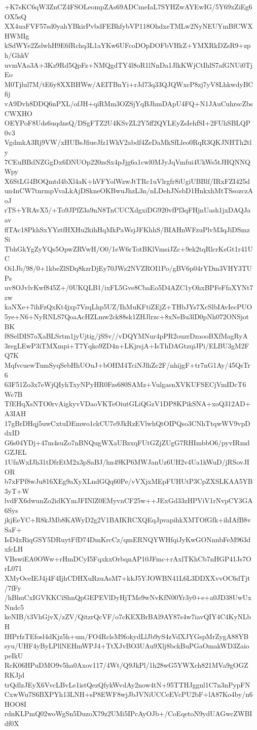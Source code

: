 +K7sKC6qW3ZnCZ4FSOLeompZAs69ADCmeIaL7SYHZwAYEwIG/5Y69xZiEg6OX5sQ
XX4uaFVF57sd0yahYBkirPvbdFEBhfybVP118OhdxeTMLw2NyNEUYmBfCWXHWMIg
kSdWYe2ZslwhH9E6fRchq3L1aYKw6UFcoDOpDOFbVHkZ+YMXRkDZsR9+zph/GhkV
uvmVAa3A+3Kz9Rd5QpFz+NMQgdTY4l8oR1lNnDa1JlkKWjCtIhlS7afGNUi0TjEo
M0Tjlul7M/tE6y8XXBHWw/AEITBnYi+rJd73q33QJQWxcP8zj7yV8LhkwdyBCfij
vA9Dvh8DDQ6nPXL/ofJH+qiRMm3OZSjYqBJhmDApU4FQ+N1JAuCuhrscZbsCWXHO
OEYPoF8Uds6uqdnsQ/DSgFTZ2U4KSvZL2Y5ff2QYLEyZsIehfSI+2FUhSBLQP0v3
VgdmkA3Rj9VW/xHUBsJfiueJfz1WkV2abdf4ZeDaMkSfLleo0RqR3QKJNHTh2tly
7CEuBBdNZGgDx6DNUOp220zsSx4pJjg6a1cwl0MJyJqVmfui4UkWs5tJHQNNQWpy
X6StLG4BOQmtd4bXl4aK+hVFYolWzwJtTRc1uVlrgfr8iUgiUBBlf/IRxFZI425d
un4nCW7tnrmpVvaLkAjDSkneOKBwuJhzL3n/nLDehJNsbD1HnkxhMtTSsozczAoJ
rTS+YRAvX5/+To9JPfZ3a9nN8TnCUCXdgxiDG920vfPf3qFHjnUash1jxDAQJaav
flTAc18PkhSxYYztfHXHu2kihHqMkPaWsjJFKhhS/BIAHnWFzuPlvM3qJiDSmzSi
TbhGkYgZyYQs5OpwZRVwH/O0/1eW6rTotBKlVmsiJZc+9ek2tqRlcrKsGt1r41UC
Oi1Jb/98/0+1kbeZlSDq8kzrDjEy70JWz2NVZROI1Po/gBV6p04rYDm3VHY3TUPs
uv8OJvlvKwf845Z+/0UKQLB1/ixFL5Gve8CbaEo5D4AZC1yOhxBPFeFfaXYNt7zw
kaNXe+7ihFzQxKt4jxp7VzqLhp5UZ/IhMuKFtiZEjZ+THbJYs7XcSlbIAvIecPUO
5ye+N6+NyRNLS7QoaAcHZLmw2ck88sk1ZHJlrzc+8xNeBu3lD0pNh072ONSjotBK
f8SelDIS7oXaBLSrtm1jyUjtig/jSSv//vDQYMNur4pPR2ouzrDzaooBXfMagRyA
3regLEwP3iTMXmpi+T7Yqko9ZD4n+LKjrsjA+IsThDAGtzqiJPi/ELBU3gM2FQ7K
MqfvcuewTumSyqSebHhUOuJ+bOHM4TciNJlhZc2F/nhijgF+tr7nG1Ay/45QsTr6
63F51Zo3x7eWjQIyhTxyNPyHR0Fzs680SAMz+VulgasnXVKUFSECjVmIDcT6Wc7B
TfEHqXsNTO0rvAigkyvVDaoVKTeOiutGLiQGzV1DP8KPikSNA+xoQ312AD+A3IAH
17gBrDHqj5uwCxtuDEmwo1ckCU7e9JkRzEVlwhQtOIPQso3CNhTtqwWV9vpDdxID
G6s04YDj+47m4suZo7nBNQugWXaUBzxqFUtGZjZUgG7RHImbbO6/pyvIRmdGZJEL
1UfnWxIJh31tDfrEtM2x3pSaBJ/hn49KP6MWJanUz6UH2v4Ua1kWuD/jRSovJIOR
b7xFPf8wJu816XEg9aXyXLndGQq60Pe/vVXjxMEpFUHUtP3CpZXSLKAA5YB3yT+W
lvdFX6dwunZo2idKYmJFINlZ0EMyvnCF25w++JExGd33zHPViV1rNvpCY3GA6Sys
jkjEeYC+R8kJMb8KAWyD2g2V1BAIKRCXQEqJpvapihkXMTOfGfk+ihIAfB8vSaF+
IsD4xRiqGSY5DRuytFfD74DmKrcCz/qmERNQYWHfqiJyKwGONnnbFeM963dxfcLH
VBswiEA0OWw+rHmDCyI5FqxkxOrbqnAP10JFmc+rAxlTKhCb7nHGP41Js7OrL071
XMyOceIEJ4j4F4IjhCDHXuRzuAsM7+kkJ5YJOWBN41L6L3DDXXvvOC6dTjt/7fFy
/hBhuCxIGVKKCiShnQpGEPEVlDyHjTMe9wNvKfN00Yr3y0+e+a0JD38UwUxNndc5
keNIB/t3VhGjvX/zZV/QitzrQcVF/o7cKEXBrBAl9AY87s4w7iavQIY4C4KyNLbH
IHPrfzTEfosl4dKjz5h+um/FO4RclsM9fokydLlJb9yS4zVdXJYGspMrZygA88YB
syu/UHF4yByLPllNEHmWPJ4+TtXJvBO3UAu9Xlj8bckBuPGaOmakWD3ZaiopeIkU
RcK06HPuDMO9v5ha0Axov117/4Wt/Q9JkPl/1h28wG5YWXch821MVa9gOGZRKJjd
trQdlzJEyX6VvcLBvLe1istQezQfykWvdAy2now4tN+95TTHJggnl1C7n3nPypFN
CxwWu7S6BXPYh13LNH+sP8EWF8wjJbJVNiUCCeEVcPU2bF+lA87Ko4by/n6HOO8I
rdnKLPmQ02woWgSn5DuzoX79z2UMi5IPcAyOJb+/CoEqetoN9ydUAGwcZWBIdf0X
